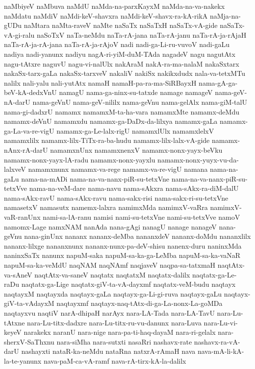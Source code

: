 {naMbiyeV
naMbuva
naMdU
naMda-na-parxKayxM
naMda-na-va-nakekx
naMdatu
naMdiV
naMdi-keV-shavxra
naMdi-keV-shavx-ra-kA-rikA
naMja-na-gUDu
naMtara
naMta-raveV
naMte
naSaTx
naSaTxH
naSaTx-vA-gide
naSaTx-vA-gi-ralu
naSoTxV
naTa-neMdu
naTa-rA-jana
naTa-rA-janu
naTa-rA-ja-rAjaH
naTa-rA-ja-rA-jana
naTa-rA-ja-rAjoV
nadi
nadi-ga-Li-ru-vuvoV
nadi-gaLu
nadiya
nadi-yanunx
nadiyu
nagA-ri-yiM-duM-TAda
nagadeV
nagu
nagutAtx
nagu-tAtxre
naguvU
nagu-vi-nalUlx
nakAraM
nakA-ra-ma-nalaM
nakaSxtarx
nakaSx-tarx-gaLa
nakaSx-tarxveV
nakaliV
nakiSx
nakikxdudx
nala-va-tetxMTu
nalilx
nali-yalu
nali-yutAtx
namaH
namaH-pa-ra-ma-SiRBayxH
nama-gA-ga-beV-kA-dedxVnU
namagU
nama-ga-ninx-su-tatxde
namage
namageV
nama-geV-nA-darU
nama-geVnU
nama-geV-nililx
nama-geVnu
nama-gelAlx
nama-giM-talU
nama-gi-dadxrU
namamx
namamxM-ta-ha-vara
namamxMte
namamx-deMdu
namamx-deVnU
namamxdu
namamx-ga-DaDx-da-lilxya
namamx-gaLa
namamx-ga-La-va-re-vigU
namamx-ga-Le-lalx-rigU
namamxlUlx
namamxlelxV
namamxlilx
namamx-lilx-TiTx-ra-ba-hudu
namamx-lilx-lalx-vA-gide
namamx-nAnx-rA-darU
namamxnUnx
namamxnenxV
namamx-nonx-yayx-beVku
namamx-nonx-yayx-lA-radu
namamx-nonx-yayxlu
namamx-nonx-yuyx-vu-da-lalxveV
namamxnunx
namamx-va-rege
namamx-va-re-vigU
namana
nama-na-gaLu
nama-na-mADi
nama-na-va-nanx-piR-su-tetxVne
nama-na-va-nanx-piR-su-tetxVve
nama-na-veM-dare
nama-navu
nama-sAkxra
nama-sAkx-ra-diM-dalU
nama-sAkx-ravU
nama-sAkx-ravu
nama-sakx-risi
nama-sakx-ri-su-tetxVne
namasetxV
namasutx
namemx-lalxra
namimxMda
namimxV-vaRra
namimxV-vaR-ranUnx
nami-sa-lA-ranu
namisi
nami-su-tetxVne
nami-su-tetxVve
namoV
namomx-Lage
namxNAM
nanAda
nana-gAgi
nanagU
nanage
nanageV
nana-geVnu
nana-ginUnx
nananx
nananx-deMba
nananxdeV
nananx-doMdu
nananxlilx
nananx-lilxge
nananxnunx
nananx-nunx-pa-deV-shisu
nanenx-duru
naninxMda
naninxSaTx
nanunx
napuM-saka
napuM-sa-ka-ga-LeMba
napuM-sa-ka-vaNaR
napuM-sa-ka-veMdU
naqNAM
naqNAmf
naqjaveV
naqpa-sa-tatxmaH
naqtAtx-va-sAneV
naqtAtx-va-saneV
naqtatx
naqtatxM
naqtatx-dalilx
naqtatx-ga-Le-raDu
naqtatx-ga-Lige
naqtatx-giV-ta-vA-dayxmf
naqtatx-veM-budu
naqtayx
naqtayxM
naqtayxda
naqtayx-gaLa
naqtayx-ga-Li-gi-ruva
naqtayx-gaLu
naqtayx-giV-ta-vAdayxM
naqtayxmf
naqtayx-naq-tAtx-di-ga-La-nonx-La-goMDa
naqtayxvu
naqtiV
narA-dhipaH
narAyx
nara-LA-Tada
nara-LA-TavU
nara-Lu-tAtxne
nara-Lu-titx-dadxre
nara-Lu-titx-ru-vu-danunx
nara-Luva
nara-Lu-vi-keyeV
narakekx
naranU
nara-nige
nara-pa-ti-haq-dayaM
nara-ri-gelalx
nara-sherxV-SaThxnu
nara-siMha
nara-sutxti
nasaRri
nashavx-rate
nashavx-ra-vA-darU
nashayxti
nataR-ka-neMdu
nataRna
natxrA-rAmaH
nava
nava-mA-li-kA-la-te-yanunx
nava-paM-ca-vA-ramf
nava-rA-tirx-kA-la-dalilx
}
